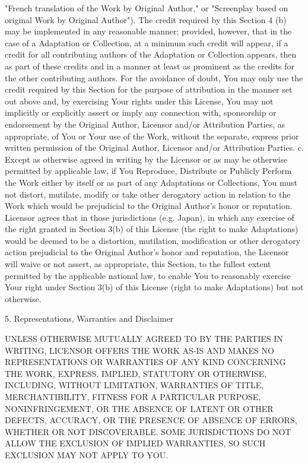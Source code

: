     "French translation of the Work by Original Author," or "Screenplay
    based on original Work by Original Author"). The credit required by
    this Section 4 (b) may be implemented in any reasonable manner;
    provided, however, that in the case of a Adaptation or Collection, at
    a minimum such credit will appear, if a credit for all contributing
    authors of the Adaptation or Collection appears, then as part of these
    credits and in a manner at least as prominent as the credits for the
    other contributing authors. For the avoidance of doubt, You may only
    use the credit required by this Section for the purpose of attribution
    in the manner set out above and, by exercising Your rights under this
    License, You may not implicitly or explicitly assert or imply any
    connection with, sponsorship or endorsement by the Original Author,
    Licensor and/or Attribution Parties, as appropriate, of You or Your
    use of the Work, without the separate, express prior written
    permission of the Original Author, Licensor and/or Attribution
    Parties.
 c. Except as otherwise agreed in writing by the Licensor or as may be
    otherwise permitted by applicable law, if You Reproduce, Distribute or
    Publicly Perform the Work either by itself or as part of any
    Adaptations or Collections, You must not distort, mutilate, modify or
    take other derogatory action in relation to the Work which would be
    prejudicial to the Original Author's honor or reputation. Licensor
    agrees that in those jurisdictions (e.g. Japan), in which any exercise
    of the right granted in Section 3(b) of this License (the right to
    make Adaptations) would be deemed to be a distortion, mutilation,
    modification or other derogatory action prejudicial to the Original
    Author's honor and reputation, the Licensor will waive or not assert,
    as appropriate, this Section, to the fullest extent permitted by the
    applicable national law, to enable You to reasonably exercise Your
    right under Section 3(b) of this License (right to make Adaptations)
    but not otherwise.

5. Representations, Warranties and Disclaimer

UNLESS OTHERWISE MUTUALLY AGREED TO BY THE PARTIES IN WRITING, LICENSOR
OFFERS THE WORK AS-IS AND MAKES NO REPRESENTATIONS OR WARRANTIES OF ANY
KIND CONCERNING THE WORK, EXPRESS, IMPLIED, STATUTORY OR OTHERWISE,
INCLUDING, WITHOUT LIMITATION, WARRANTIES OF TITLE, MERCHANTIBILITY,
FITNESS FOR A PARTICULAR PURPOSE, NONINFRINGEMENT, OR THE ABSENCE OF
LATENT OR OTHER DEFECTS, ACCURACY, OR THE PRESENCE OF ABSENCE OF ERRORS,
WHETHER OR NOT DISCOVERABLE. SOME JURISDICTIONS DO NOT ALLOW THE EXCLUSION
OF IMPLIED WARRANTIES, SO SUCH EXCLUSION MAY NOT APPLY TO YOU.

